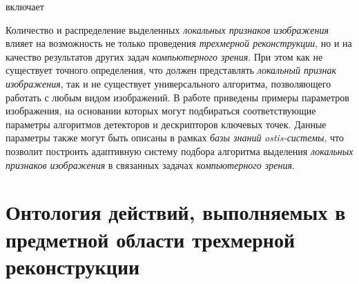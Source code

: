 \begin{SCn}
\begin{scnrelfromset}{включает}
\begin{scnindent}
            \begin{scnindent}
                \begin{scnindent}
                \end{scnindent}
                \begin{scnindent}
                \end{scnindent}
            \end{scnindent}
            \begin{scnindent}
            \end{scnindent}
        \end{scnindent}
    \end{scnrelfromset}
\end{SCn}

Количество и распределение выделенных \textit{локальных признаков изображения} влияет на возможность не только проведения \textit{трехмерной реконструкции}, но и на качество результатов других задач \textit{компьютерного зрения}. При этом как не существует точного определения, что должен представлять \textit{локальный признак изображения}, так и не существует универсального алгоритма, позволяющего работать с любым видом изображений. В работе  приведены примеры параметров изображения, на основании которых могут подбираться соответствующие параметры алгоритмов детекторов и дескрипторов ключевых точек. Данные параметры также могут быть описаны в рамках \textit{базы знаний} \textit{ostis-системы}, что позволит построить адаптивную систему подбора алгоритма выделения \textit{локальных признаков изображения} в связанных задачах \textit{компьютерного зрения}.

\section{Онтология действий, выполняемых в предметной области трехмерной реконструкции}
\label{sec_3d_models_actions}


